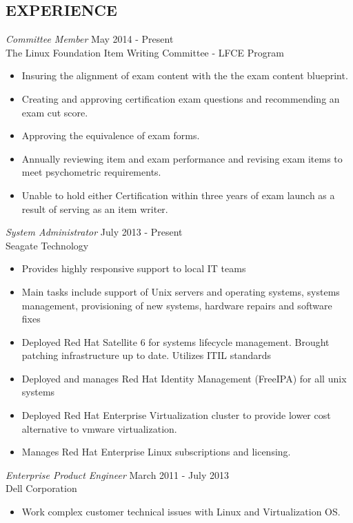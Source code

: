 \documentclass[margin]{res}
\begin{document}
\begin{resume}
\section{EXPERIENCE}
	{\sl Committee Member} \hfill May 2014 - Present \\
    The Linux Foundation Item Writing Committee - LFCE Program
    \begin{itemize}  \itemsep -2pt %
    \item Insuring the alignment of exam content with the the exam content blueprint.
    \item Creating and approving certification exam questions and recommending an exam cut score.
    \item Approving the equivalence of exam forms.
    \item Annually reviewing item and exam performance and revising exam items to meet psychometric requirements.
    \item Unable to hold either Certification within three years of exam launch as a result of serving as an item writer.
    \end{itemize}
	{\sl System Administrator} \hfill July 2013 - Present \\
	Seagate Technology
	\begin{itemize}  \itemsep -2pt %
		\item Provides highly responsive support to local IT teams
		\item Main tasks include support of Unix servers and operating systems, systems management, provisioning of new systems, hardware repairs and software fixes
		\item Deployed Red Hat Satellite 6 for systems lifecycle management. Brought patching infrastructure up to date. Utilizes ITIL standards
		\item Deployed and manages Red Hat Identity Management (FreeIPA) for all unix systems
		\item Deployed Red Hat Enterprise Virtualization cluster to provide lower cost alternative to vmware virtualization.
		\item Manages Red Hat Enterprise Linux subscriptions and licensing.
	\end{itemize}
 	{\sl Enterprise Product Engineer} \hfill March 2011 - July 2013 \\
 	Dell Corporation
 	\begin{itemize}  \itemsep -2pt %
 		\item Work complex customer technical issues with Linux and Virtualization OS.

\end{itemize}
\end{resume}
\end{document}
